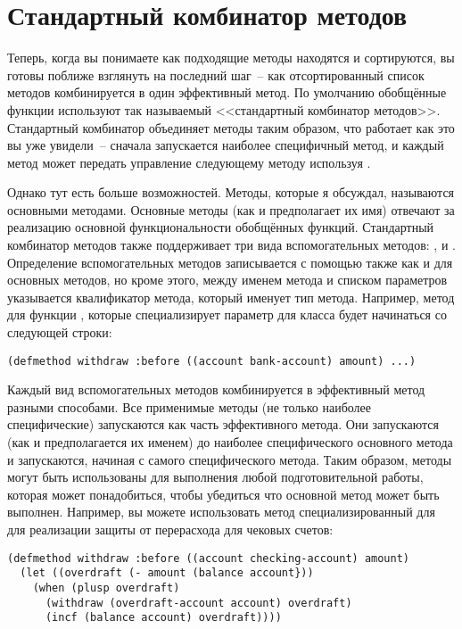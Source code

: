 \section{Стандартный комбинатор методов}

Теперь, когда вы понимаете как подходящие методы находятся и сортируются, вы готовы
поближе взглянуть на последний шаг~-- как отсортированный список методов комбинируется в
один эффективный метод.  По умолчанию обобщённые функции используют так называемый
<<стандартный комбинатор методов>>.  Стандартный комбинатор объединяет методы таким образом,
что  работает как это вы уже увидели~-- сначала запускается
наиболее специфичный метод, и каждый метод может передать управление следующему методу
используя .

Однако тут есть больше возможностей.  Методы, которые я обсуждал, называются основными
методами.  Основные методы (как и предполагает их имя) отвечают за реализацию основной
функциональности обобщённых функций.  Стандартный комбинатор методов также поддерживает
три вида вспомогательных методов: ,  и .
Определение вспомогательных методов записывается с помощью  также как и
для основных методов, но кроме этого, между именем метода и списком параметров указывается
квалификатор метода, который именует тип метода.  Например, метод  для
функции , которые специализирует параметр  для класса
 будет начинаться со следующей строки:

\begin{lstlisting}
(defmethod withdraw :before ((account bank-account) amount) ...)
\end{lstlisting}

Каждый вид вспомогательных методов комбинируется в эффективный метод разными способами.
Все применимые методы  (не только наиболее специфические) запускаются как
часть эффективного метода.  Они запускаются (как и предполагается их именем) до наиболее
специфического основного метода и запускаются, начиная с самого специфического метода.
Таким образом, методы  могут быть использованы для выполнения любой
подготовительной работы, которая может понадобиться, чтобы убедиться что основной метод
может быть выполнен.  Например, вы можете использовать метод 
специализированный для  для реализации защиты от перерасхода для
чековых счетов:

\begin{lstlisting}
(defmethod withdraw :before ((account checking-account) amount)
  (let ((overdraft (- amount (balance account}))
    (when (plusp overdraft)
      (withdraw (overdraft-account account) overdraft)
      (incf (balance account) overdraft))))
\end{lstlisting}

